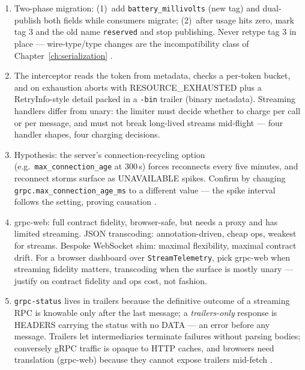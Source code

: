 \begin{enumerate}[leftmargin=2.2em]
    may have succeeded after the deadline). \texttt{GetRobotStatus} is a
    read with no side effects, so retrying it is harmless --- retry safety
    is a property of the method's semantics, not the status code
    (Chapter~\ref{ch:idempotency}).
  \item Two-phase migration: (1)~add \texttt{battery\_millivolts} (new tag)
    and dual-publish both fields while consumers migrate; (2)~after usage
    hits zero, mark tag 3 and the old name \texttt{reserved} and stop
    publishing. Never retype tag 3 in place --- wire-type/type changes are
    the incompatibility class of Chapter~\ref{ch:serialization}
    \cite{protobufdocs}.
  \item The interceptor reads the token from metadata, checks a per-token
    bucket, and on exhaustion aborts with RESOURCE\_EXHAUSTED plus a
    RetryInfo-style detail packed in a \texttt{-bin} trailer (binary
    metadata). Streaming handlers differ from unary: the limiter must
    decide whether to charge per call or per message, and must not break
    long-lived streams mid-flight --- four handler shapes, four charging
    decisions.
  \item Hypothesis: the server's connection-recycling option (e.g.\
    \texttt{max\_connection\_age} at 300\,s) forces reconnects every five
    minutes, and reconnect storms surface as UNAVAILABLE spikes. Confirm by
    changing \texttt{grpc.max\_connection\_age\_ms} to a different value ---
    the spike interval follows the setting, proving causation
    \cite{grpcdocs}.
  \item grpc-web: full contract fidelity, browser-safe, but needs a proxy
    and has limited streaming. JSON transcoding: annotation-driven, cheap
    ops, weakest for streams. Bespoke WebSocket shim: maximal flexibility,
    maximal contract drift. For a browser dashboard over
    \texttt{StreamTelemetry}, pick grpc-web when streaming fidelity
    matters, transcoding when the surface is mostly unary --- justify on
    contract fidelity and ops cost, not fashion.
  \item \texttt{grpc-status} lives in trailers because the definitive
    outcome of a streaming RPC is knowable only after the last message; a
    \emph{trailers-only} response is HEADERS carrying the status with no
    DATA --- an error before any message. Trailers let intermediaries
    terminate failures without parsing bodies; conversely gRPC traffic is
    opaque to HTTP caches, and browsers need translation (grpc-web) because
    they cannot expose trailers mid-fetch \cite{rfc9113, grpcdocs}.
\end{enumerate}

